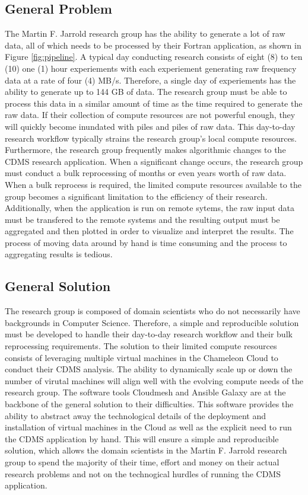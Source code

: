 \documentclass[9pt,twocolumn,twoside]{../../styles/osajnl}
\begin{document}
\subsection{General Problem} \label{problem}
The Martin F. Jarrold research group has the ability to generate a lot
of raw data, all of which needs to be processed by their Fortran
application, as shown in Figure \ref{fig:pipeline}. A typical day
conducting research consists of eight (8) to ten (10) one (1) hour
experiements with each experiement generating raw frequency data at a
rate of four (4) MB/s. Therefore, a single day of experiements has the
ability to generate up to 144 GB of data. The research group must be
able to process this data in a similar amount of time as the time
required to generate the raw data. If their collection of compute
resources are not powerful enough, they will quickly become inundated
with piles and piles of raw data. This day-to-day research workflow
typically strains the research group's local compute
resources. Furthermore, the research group frequently makes
algorithmic changes to the CDMS research application. When a
significant change occurs, the research group must conduct a bulk
reprocessing of months or even years worth of raw data. When a bulk
reprocess is required, the limited compute resources available to the
group becomes a significant limitation to the efficiency of their
research. Additionally, when the application is run on remote sytems,
the raw input data must be transfered to the remote systems and the
resulting output must be aggregated and then plotted in order to
visualize and interpret the results. The process of moving data around
by hand is time consuming and the process to aggregating results is
tedious.

\subsection{General Solution} \label{solution}
The research group is composed of domain scientists who do not
necessarily have backgrounds in Computer Science. Therefore, a simple
and reproducible solution must be developed to handle their day-to-day
research workflow and their bulk reprocessing requirements. The
solution to their limited compute resources consists of leveraging
multiple virtual machines in the Chameleon Cloud to conduct their CDMS
analysis. The ability to dynamically scale up or down the number of
virutal machines will align well with the evolving compute needs of
the research group. The software tools Cloudmesh and Ansible Galaxy
are at the backbone of the general solution to their
difficulties. This software provides the ability to abstract away the
technological details of the deployment and installation of virtual
machines in the Cloud as well as the explicit need to run the CDMS
application by hand. This will ensure a simple and reproducible
solution, which allows the domain scientists in the Martin F. Jarrold
research group to spend the majority of their time, effort and money
on their actual research problems and not on the technogical hurdles
of running the CDMS application.
\end{document}
